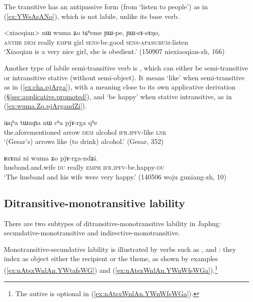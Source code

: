 The transitive  has an antipassive form  (from `listen to people') as in (\ref{ex:YWsAsANo}), which is not labile, unlike its base verb.

\begin{exe}
\ex \label{ex:YWsAsANo}
\gll <xiaoqian> nɯ wuma ʑo tɕʰeme ɲɯ-pe, ɲɯ-sɤ-sɤŋo,  \\
\textsc{anthr} \textsc{dem} really \textsc{emph} girl \textsc{sens}-be.good \textsc{sens}-\textsc{apass}:\textsc{hum}-listen \\
\glt `Xiaoqian is a very nice girl, she is obedient.' (150907 niexiaoqian-zh, 166)
\end{exe}  

Another type of labile semi-transitive verb is , which can either be semi-transitive or intransitive stative (without semi-object). It means `like' when semi-transitive as in (\ref{ex:cha.pjArga}), with a meaning close to its own applicative derivation (§\ref{sec:applicative.promoted}), and `be happy' when stative intransitive, as in (\ref{ex:wuma.Zo.pjArgandZi}).

\begin{exe}
\ex \label{ex:cha.pjArga}
\gll iɕqʰa tɯmɲa nɯ cʰa pjɤ-rga qʰe \\
the.aforementioned arrow \textsc{dem} alcohol \textsc{ifr}.\textsc{ipfv}-like \textsc{lnk} \\
\glt `(Gesar's) arrows like (to drink) alcohol.' (Gesar, 352)
\end{exe}

\begin{exe}
\ex \label{ex:wuma.Zo.pjArgandZi}
\gll ʁzɤmi ni wuma ʑo pjɤ-rga-ndʑi. \\
husband.and.wife \textsc{du} really \textsc{emph} \textsc{ifr}.\textsc{ipfv}-be.happy-\textsc{du} \\
\glt `The husband and his wife were very happy.' (140506 woju guniang-zh, 10)
\end{exe}

 \subsection{Ditransitive-monotransitive lability} \label{sec:secundative.monotransitive}
There are two subtypes of ditransitive-monotransitive lability in Japhug: secun\-da\-tive-monotransitive and indirective-monotransitive.

Monotransitive-secundative lability is illustrated by verbs such as ,  and : they index as object either the recipient or the theme, as shown by examples (\ref{ex:nAtsxWnlAn.YWtafsWG}) and (\ref{ex:nAtsxWnlAn.YWnWfsWGa}).\footnote{The autive is optional in (\ref{ex:nAtsxWnlAn.YWnWfsWGa}). }

